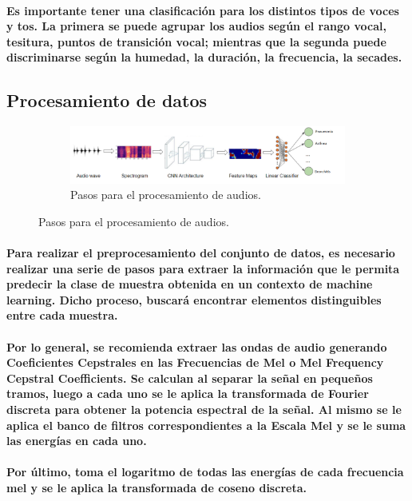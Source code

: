 \documentclass[a4paper,11pt,twocolumn]{article}
\begin{document}
\paragraph{Es importante tener una clasificación para los distintos tipos de voces y tos. La primera se puede agrupar los audios según el rango vocal, tesitura, puntos de transición vocal; mientras que la segunda puede discriminarse según la humedad, la duración, la frecuencia, la secades\cite{tp}.}
\subsection{Procesamiento de datos}
\begin{figure}[H]
\begin{subfigure}[b]{1\columnwidth}
\includegraphics[width=\textwidth]{audiowave_to_classifier}
\caption{Pasos para el procesamiento de audios.}
\end{subfigure}
\end{figure}
\paragraph{Para realizar el preprocesamiento del conjunto de datos, es necesario realizar una serie de pasos para extraer la información que le permita predecir la clase de muestra obtenida en un contexto de machine learning. Dicho proceso, buscará encontrar elementos distinguibles entre cada muestra.}
\paragraph{Por lo general, se recomienda extraer las ondas de audio generando Coeﬁcientes Cepstrales en las Frecuencias de Mel o Mel Frequency Cepstral Coeﬃcients. Se calculan al separar la señal en pequeños tramos, luego a cada uno se le aplica la transformada de Fourier discreta para obtener la potencia espectral de la señal. Al mismo se le aplica el banco de filtros correspondientes a la Escala Mel y se le suma las energías en cada uno\cite{fourier}.}
\paragraph{Por último, toma el logaritmo de todas las energías de cada frecuencia mel y se le aplica la transformada de coseno discreta.}
\end{document}
